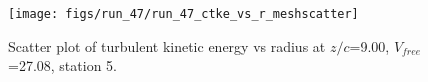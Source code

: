 \begin{figure}[H]
\centering
\texttt{[image: figs/run\_47/run\_47\_ctke\_vs\_r\_meshscatter]}
\caption{Scatter plot of turbulent kinetic energy vs radius at $z/c$=9.00, $V_{free}$=27.08, station 5.}
\end{figure}


